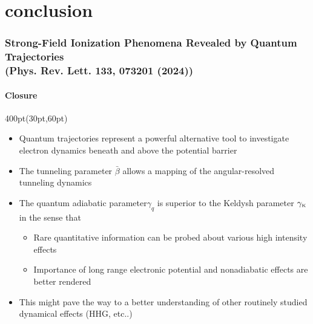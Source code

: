 
\section{conclusion}

\begin{frame}
\frametitle{Strong-Field Ionization Phenomena Revealed by Quantum Trajectories \\
\small (Phys. Rev. Lett. \textbf{133}, 073201 (2024))}

\framesubtitle{Closure}

\small
\begin{textblock*}{400pt}(30pt,60pt)
\begin{itemize}
\footnotesize
\item Quantum trajectories represent a powerful alternative tool
to investigate electron dynamics beneath and above the potential barrier 
\item The tunneling parameter $\bar{\beta}$ allows a mapping 
of the angular-resolved tunneling dynamics 
\item The quantum adiabatic parameter$\gamma_q$ is superior to 
the Keldysh parameter $\gamma_{\mbox{\tiny$\rm K$}}$ in the sense that
\begin{itemize}
\item[$\bullet$] Rare quantitative information can be probed about 
various high intensity effects
\item[$\bullet$] Importance of long range electronic potential 
and nonadiabatic effects are better rendered 
\end{itemize}

\vspace{20pt}

\item This might pave the way to a  better understanding of 
other routinely studied dynamical effects (HHG, etc..)
\end{itemize}

\end{textblock*}



\end{frame}
